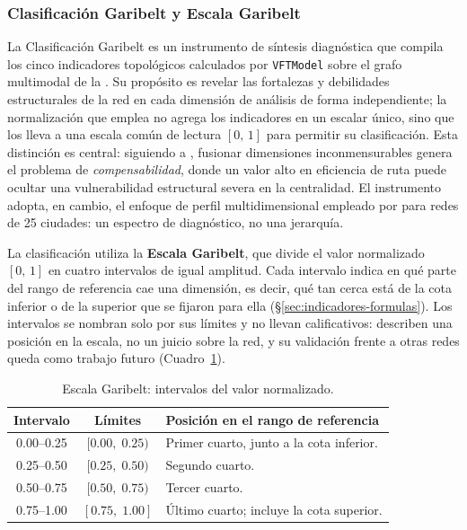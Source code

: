 \subsubsection*{Clasificación Garibelt y Escala Garibelt}
\label{subsubsec:glosario-clasificacion-garibelt}
La Clasificación Garibelt es un instrumento de síntesis diagnóstica que compila
los cinco indicadores topológicos calculados por \texttt{VFTModel} sobre el
grafo multimodal de la \zmvm{}. Su propósito es revelar las fortalezas y
debilidades estructurales de la red en cada dimensión de análisis de forma
independiente; la normalización que emplea no agrega los indicadores en un
escalar único, sino que los lleva a una escala común de lectura $[0,\,1]$ para
permitir su clasificación. Esta distinción es central: siguiendo a
\citet{hossain2024}, fusionar dimensiones inconmensurables genera el problema de
\textit{compensabilidad}, donde un valor alto en eficiencia de ruta puede
ocultar una vulnerabilidad estructural severa en la centralidad. El instrumento
adopta, en cambio, el enfoque de perfil multidimensional empleado por
\citet{kujala2018} para redes \gtfs{} de 25 ciudades: un espectro de
diagnóstico, no una jerarquía.

La clasificación utiliza la \textbf{Escala Garibelt}, que divide el valor
normalizado $[0,\,1]$ en cuatro intervalos de igual amplitud. Cada intervalo
indica en qué parte del rango de referencia cae una dimensión, es decir, qué
tan cerca está de la cota inferior o de la superior que se fijaron para ella
(§\ref{sec:indicadores-formulas}). Los intervalos se nombran solo por sus
límites y no llevan calificativos: describen una posición en la escala, no un
juicio sobre la red, y su validación frente a otras redes queda como trabajo
futuro (Cuadro~\ref{tab:escala-garibelt}).

\begin{table}[htbp]
\centering
\caption[Escala Garibelt]{Escala Garibelt: intervalos del valor normalizado.}
\label{tab:escala-garibelt}
\small
\begin{tabular}{@{} c c p{7.5cm} @{}}
\toprule
\textbf{Intervalo} & \textbf{Límites} & \textbf{Posición en el rango de referencia} \\
\midrule
0.00--0.25 & $[0.00,\;0.25)$ & Primer cuarto, junto a la cota inferior. \\
0.25--0.50 & $[0.25,\;0.50)$ & Segundo cuarto. \\
0.50--0.75 & $[0.50,\;0.75)$ & Tercer cuarto. \\
0.75--1.00 & $[0.75,\;1.00]$ & Último cuarto; incluye la cota superior. \\
\bottomrule
\end{tabular}
\smallskip

\end{table}

